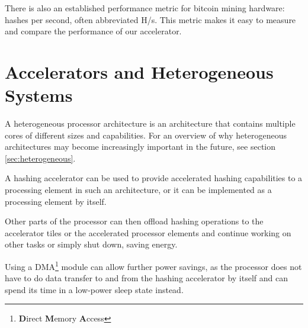 There is also an established performance metric for bitcoin mining hardware:
hashes per second, often abbreviated H/s. This metric makes it easy
to measure and compare the performance of our accelerator.

\section{Accelerators and Heterogeneous Systems}

A heterogeneous processor architecture is an architecture that contains multiple
cores of different sizes and capabilities. For an overview of why heterogeneous
architectures may become increasingly important in the future, see section
\ref{sec:heterogeneous}.

A hashing accelerator can be used to provide accelerated hashing capabilities
to a processing element in such an architecture, or it can be implemented as
a processing element by itself.

Other parts of the processor can then offload hashing operations to the
accelerator tiles or the accelerated processor elements and continue
working on other tasks or simply shut down, saving energy.

Using a DMA\footnote{\textbf{D}irect \textbf{M}emory \textbf{A}ccess} module can allow further
power savings, as the processor does not have to do data transfer to
and from the hashing accelerator by itself and can spend its time
in a low-power sleep state instead.


